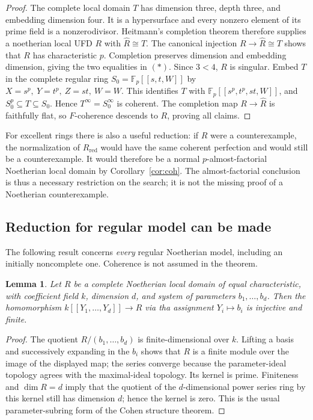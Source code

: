 \documentclass[11pt,a4paper]{amsart}
\numberwithin{equation}{section}
\newtheorem{lemma}[theorem]{Lemma}
\newcommand{\FF}{\mathbb F}
\begin{document}
 \begin{proof}
The complete local domain $T$ has dimension three, depth three,
and embedding dimension four.
It is a hypersurface and every nonzero element of its prime field
is a nonzerodivisor.
Heitmann's completion theorem \cite{Heitmann} therefore supplies
a noetherian local UFD $R$ with $\widehat R\cong T$.
The canonical injection $R\to\widehat R\cong T$ shows that
$R$ has characteristic $p$.
Completion preserves dimension and embedding dimension, giving
the two equalities in $ (\ast)$.
Since $3<4$, $R$ is singular.
Embed $T$ in the complete regular ring
$S_0=\FF_p[[s,t,W]]$ by $X=s^p,\ Y=t^p,\ Z=st,\ W=W$.
This identifies $T$ with
$\FF_p[[s^p,t^p,st,W]]$, and
$S_0^p\subseteq T\subseteq S_0.$
 Hence $T^\infty=S_0^\infty$ is coherent.
 The completion map $R\to\widehat R$ is faithfully flat, so
 $F$-coherence descends to $R$, proving all claims.
 \end{proof}
 
 
 For excellent rings there is also a useful reduction:
 if $R$ were a counterexample, the normalization of $R_{\mathrm{red}}$ would
 have the same coherent perfection and would still be a counterexample.
 It would therefore be a normal $p$-almost-factorial Noetherian
 local domain by Corollary~\ref{cor:coh}.
 The almost-factorial conclusion is thus a necessary restriction on
 the search; it is not the missing proof of a Noetherian counterexample.
  \subsection{Reduction for regular model can be made }

 
  The following result concerns
 \emph{every} regular Noetherian model, including an initially
 noncomplete one. Coherence is not assumed in the theorem.
 
 \begin{lemma}\label{lem:parameter}
 Let $R$ be a complete Noetherian local domain of equal
 characteristic, with coefficient field $k$, dimension $d$,
and system of parameters $b_1,\ldots,b_d$.
Then the homomorphism
$k[[Y_1,\ldots,Y_d]]\to R$ via tha assignment $ Y_i\mapsto b_i	$ 	is injective and finite.
\end{lemma}
 \begin{proof}
The quotient $R/(b_1,\ldots,b_d)$ is finite-dimensional over $k$.
Lifting a basis and successively expanding in the $b_i$ shows	that $R$ is a finite module over the image of the displayed map;
the series converge because the parameter-ideal topology agrees
with the maximal-ideal topology.
	Its kernel is prime. Finiteness and $\dim R=d$ imply that the
quotient of the $d$-dimensional power series ring by this kernel
still has dimension $d$; hence the kernel is zero.
This is the usual parameter-subring form of the Cohen structure
theorem.
 \end{proof}
 
\end{document}
